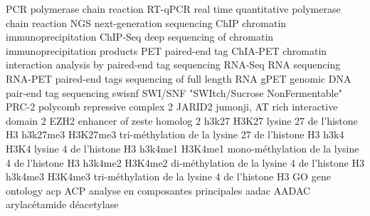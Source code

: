 	{PCR}
	{polymerase chain reaction}
	{RT-qPCR}
	{real time quantitative polymerase chain reaction}
	{NGS}
	{next-generation sequencing}
	{ChIP}
	{chromatin immunoprecipitation}
	{ChIP-Seq}
	{deep sequencing of chromatin immunoprecipitation products}
	{PET}
	{paired-end tag}
	{ChIA-PET}
	{chromatin interaction analysis by paired-end tag sequencing}
	{RNA-Seq}
	{RNA sequencing}
	{RNA-PET}
	{paired-end tags sequencing of full length RNA}
	{gPET}
	{genomic DNA pair-end tag sequencing}
%
\newacronym
	{swisnf}
	{SWI/SNF}
	{"SWItch/Sucrose NonFermentable"}
	{PRC-2}
	{polycomb repressive complex 2}
	{JARID2}
	{jumonji, AT rich interactive domain 2}
	{EZH2}
	{enhancer of zeste homolog 2}
%
\newacronym
	{h3k27}
	{H3K27}
	{lysine 27 de l'histone H3}
\newacronym
	{h3k27me3}
	{H3K27me3}
	{tri-méthylation de la lysine 27 de l'histone H3}
\newacronym
	{h3k4}
	{H3K4}
	{lysine 4 de l'histone H3}
\newacronym
	{h3k4me1}
	{H3K4me1}
	{mono-méthylation de la lysine 4 de l'histone H3}
\newacronym
	{h3k4me2}
	{H3K4me2}
	{di-méthylation de la lysine 4 de l'histone H3}
\newacronym
	{h3k4me3}
	{H3K4me3}
	{tri-méthylation de la lysine 4 de l'histone H3}
%
	{GO}
	{gene ontology}
\newacronym
	{acp}
	{ACP}
	{analyse en composantes principales}
%
\newacronym
	{aadac}
	{AADAC}
	{arylacétamide déacetylase}
